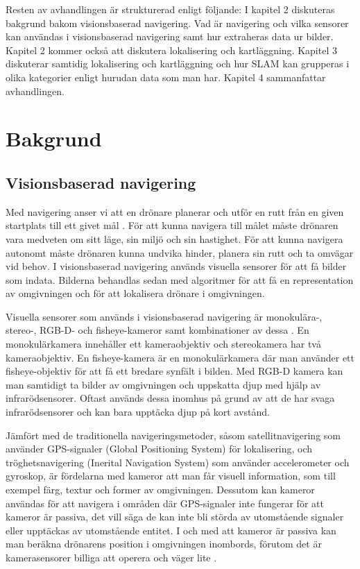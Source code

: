Resten av avhandlingen är strukturerad enligt följande: I kapitel 2 diskuteras bakgrund bakom visionsbaserad navigering. Vad är navigering och vilka sensorer kan användas i visionsbaserad navigering samt hur extraheras data ur bilder. Kapitel 2 kommer också att diskutera lokalisering och kartläggning. Kapitel 3 diskuterar samtidig lokalisering och kartläggning och hur SLAM kan grupperas i olika kategorier enligt hurudan data som man har. Kapitel 4 sammanfattar avhandlingen.

\chapter{Bakgrund}

\section{Visionsbaserad navigering}

Med navigering anser vi att en drönare planerar och utför en rutt från en given startplats till ett givet mål \citep{geospatial}. För att kunna navigera till målet måste drönaren vara medveten om sitt läge, sin miljö och sin hastighet. För att kunna navigera autonomt måste drönaren kunna undvika hinder, planera sin rutt och ta omvägar vid behov. I visionsbaserad navigering används visuella sensorer för att få bilder som indata. Bilderna behandlas sedan med algoritmer för att få en representation av omgivningen och för att lokalisera drönare i omgivningen. 

Visuella sensorer som används i visionsbaserad navigering är monokulära-, stereo-, RGB-D- och fisheye-kameror samt kombinationer av dessa \citep{geospatial}. En monokulärkamera innehåller ett kameraobjektiv och stereokamera har två kameraobjektiv. En fisheye-kamera är en monokulärkamera där man använder ett fisheye-objektiv för att få ett bredare synfält i bilden. Med RGB-D kamera kan man samtidigt ta bilder av omgivningen och uppskatta djup med hjälp av infrarödsensorer. Oftast används dessa inomhus på grund av att de har svaga infrarödsensorer och kan bara upptäcka djup på kort avstånd. 

Jämfört med de traditionella navigeringsmetoder, såsom satellitnavigering som använder GPS-signaler (Global Positioning System) för lokalisering, och tröghetsnavigering (Inerital Navigation System) som använder accelerometer och gyroskop, är fördelarna med kameror att man får visuell information, som till exempel färg, textur och former av omgivningen. Dessutom kan kameror användas för att navigera i områden där GPS-signaler inte fungerar för att kameror är passiva, det vill säga de kan inte bli störda av utomstående signaler eller upptäckas av utomstående entitet. I och med att kameror är passiva kan man beräkna drönarens position i omgivningen inombords, förutom det är kamerasensorer billiga att operera och väger lite \citep{opticalflowuav,geospatial}.

